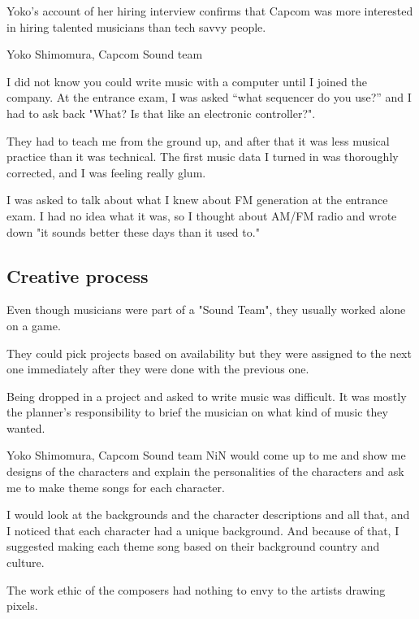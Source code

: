 Yoko's account of her hiring interview confirms that Capcom was more interested in hiring talented musicians than tech savvy people.

\begin{q}{Yoko Shimomura, Capcom Sound team\cite{beep199010}}
  
I did not know you could write music with a computer until I joined the company. At the entrance exam, I was asked “what sequencer do you use?” and I had to ask back "What? Is that like an electronic controller?".

They had to teach me from the ground up, and after that it was less musical practice than it was technical. The first music data I turned in was thoroughly corrected, and I was feeling really glum.

I was asked to talk about what I knew about FM generation at the entrance exam. I had no idea what it was, so I thought about AM/FM radio and wrote down "it sounds better these days than it used to."
\end{q}



\subsection{Creative process}
Even though musicians were part of a "Sound Team", they usually worked alone on a game. 

They could pick projects based on availability\cite{sf2musics} but they were assigned to the next one immediately after they were done with the previous one.


Being dropped in a project and asked to write music was difficult. It was mostly the planner's responsibility to brief the musician on what kind of music they wanted\cite{sf2_music}.

\begin{q}{Yoko Shimomura, Capcom Sound team\cite{sf2_oral_history}}
NiN would come up to me and show me designs of the characters and explain the personalities of the characters and ask me to make theme songs for each character.

I would look at the backgrounds and the character descriptions and all that, and I noticed that each character had a unique background. And because of that, I suggested making each theme song based on their background country and culture.
\end{q}

The work ethic of the composers had nothing to envy to the artists drawing pixels.

